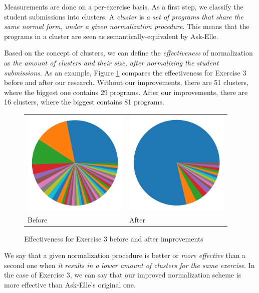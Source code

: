 Measurements are done on a per-exercise basis. As a first step, we classify the student submissions into clusters. A \emph{cluster} is \emph{a set of programs that share the same normal form, under a given normalization procedure}. This means that the programs in a cluster are seen as semantically-equivalent by Ask-Elle.

Based on the concept of clusters, we can define the \emph{effectiveness} of normalization as \emph{the amount of clusters and their size, after normalizing the student submissions}. As an example, Figure \ref{fig:method-ex3-clusters} compares the effectiveness for Exercise 3 before and after our research. Without our improvements, there are 51 clusters, where the biggest one contains 29 programs. After our improvements, there are 16 clusters, where the biggest contains 81 programs.

\begin{figure}
\centering
\begin{tabular}{ >{\centering\arraybackslash}m{14em} >{\centering\arraybackslash}m{14em} }
\includegraphics[height=5cm]{graphs/cluster-baseline-3.png}
&
\includegraphics[height=5cm]{graphs/cluster-aggressive-3.png} \\
Before & After
\end{tabular}
\caption{Effectiveness for Exercise 3 before and after improvements}
\label{fig:method-ex3-clusters}
\end{figure}

We say that a given normalization procedure is better or \emph{more effective} than a second one when \emph{it results in a lower amount of clusters for the same exercise}. In the case of Exercise 3, we can say that our improved normalization scheme is more effective than Ask-Elle's original one.

